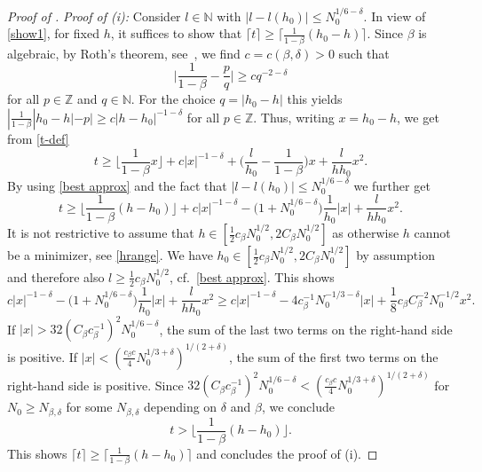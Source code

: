 \documentclass[reqno]{amsart}
\theoremstyle{plain}
\theoremstyle{definition}
\numberwithin{equation}{section}
\newcommand{\N}{\mathbb{N}}
\newcommand{\Z}{\mathbb{Z}}
\begin{document}
\begin{proof}[Proof of ]
\emph{Proof of {\rm (i)}:}  Consider  $l \in \N$ with  $|l-l(h_0)| \le N_0^{1/6 - \delta}$.  In view of \eqref{show1}, for fixed $h$,  it suffices to show that $\lceil t \rceil \ge   \lceil  \frac{1}{1-\beta }    (h_0-h)\rceil$.   Since $\beta$ is algebraic, by Roth's theorem, see~\cite{Roth}, we find $c=c(\beta,\delta)>0$ such that 
$${\Big| \frac{1}{1-\beta}     - \frac{p}{q}\Big| \ge c  q^{-2-\delta} }$$
for all  $p \in \Z$ and $q \in \N$. For the choice $q = |h_0-h|$  this yields
$ |  \frac{1}{1-\beta }    |h_0-h|  - p| \ge c |h-h_0|^{-1-\delta} $ for all $p \in \Z$. Thus, writing $x = h_0 - h$, we get from \eqref{t-def}
$$ t \ge   \Big\lfloor  \frac{1}{1-\beta }    x   \Big\rfloor  + c |x|^{-1-\delta} + \Big(   \frac{l }{h_0} -  \frac{1}{1-\beta }     \Big)x   + \frac{l}{h h_0} x^2.  $$ 
By using \eqref{best approx} and the fact that $|l-l(h_0)| \le N_0^{1/6-\delta}$ we further get
$$ t \ge   \Big\lfloor  \frac{1}{1-\beta }    (h-h_0)   \Big\rfloor  + c |x|^{-1-\delta} - \Big(1 + N_0^{1/6-\delta}) \frac{1}{h_0} |x|   + \frac{l}{h h_0} x^2.  $$ 
It is not restrictive to assume that $h \in  [  \frac{1}{2}  c_\beta  N_0^{1/2},  2  C_\beta  N_0^{1/2}]$ as otherwise $h$ cannot be a minimizer, see \eqref{hrange}. We have $h_0 \in [ \frac{1}{2}  c_\beta N_0^{1/2},  2  C_\beta  N_0^{1/2}]$ by assumption and therefore also $l \ge   \frac{1}{2}  c_\beta  N_0^{1/2}$, cf.\ \eqref{best approx}. This shows 
$${c |x|^{-1-\delta} - \Big(1 + N_0^{1/6-\delta}\Big) \frac{1}{h_0} |x|   + \frac{l}{h h_0} x^2   \ge c |x|^{-1-\delta} -   4  c_\beta^{-1}  N_0^{-1/3-\delta} |x|   +  \frac{1}{8}  c_\beta C_\beta^{-2}  N_0^{-1/2} x^2.  } $$
If $|x| >  32   (C_\beta c_\beta^{-1})^2  N_0^{1/6-\delta}$,
the  sum of the  last two terms on the right-hand side  is
 positive. If $|x| < ( \frac{c_\beta c}{ 4  }
N_0^{1/3+\delta})^{1/(2+\delta)}$, the  sum of the  first two
terms on the right-hand side  is   positive. Since   $32  (C_\beta c_\beta^{-1})^2  N_0^{1/6-\delta} <   (  \frac{c_\beta c}{4}   N_0^{1/3+\delta})^{1/(2+\delta)} $ for $N_0 \ge N_{\beta,\delta}  $ for some $ N_{\beta,\delta}  $ depending on $\delta$ and $\beta$, we conclude
$$ t >   \Big\lfloor  \frac{1}{1-\beta }    (h-h_0)   \Big\rfloor.$$
This shows $ \lceil t \rceil \ge   \lceil   \frac{1}{1-\beta }    (h-h_0) \rceil $ and concludes the proof of (i). 
 



\end{proof}
\end{document}

